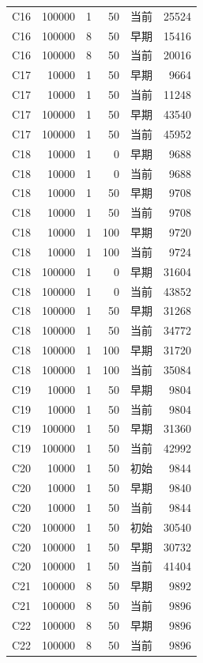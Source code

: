 \documentclass[UTF8,a4paper,10pt,twocolumn,fontset=fandol]{ctexart}
\begin{document}
\begin{longtable}{@{}lrrrlr@{}}
C16 & 100000 & 1 & 50 & 当前 & 25524 \\
C16 & 100000 & 8 & 50 & 早期 & 15416 \\
C16 & 100000 & 8 & 50 & 当前 & 20016 \\
C17 & 10000 & 1 & 50 & 早期 & 9664 \\
C17 & 10000 & 1 & 50 & 当前 & 11248 \\
C17 & 100000 & 1 & 50 & 早期 & 43540 \\
C17 & 100000 & 1 & 50 & 当前 & 45952 \\
C18 & 10000 & 1 & 0 & 早期 & 9688 \\
C18 & 10000 & 1 & 0 & 当前 & 9688 \\
C18 & 10000 & 1 & 50 & 早期 & 9708 \\
C18 & 10000 & 1 & 50 & 当前 & 9708 \\
C18 & 10000 & 1 & 100 & 早期 & 9720 \\
C18 & 10000 & 1 & 100 & 当前 & 9724 \\
C18 & 100000 & 1 & 0 & 早期 & 31604 \\
C18 & 100000 & 1 & 0 & 当前 & 43852 \\
C18 & 100000 & 1 & 50 & 早期 & 31268 \\
C18 & 100000 & 1 & 50 & 当前 & 34772 \\
C18 & 100000 & 1 & 100 & 早期 & 31720 \\
C18 & 100000 & 1 & 100 & 当前 & 35084 \\
C19 & 10000 & 1 & 50 & 早期 & 9804 \\
C19 & 10000 & 1 & 50 & 当前 & 9804 \\
C19 & 100000 & 1 & 50 & 早期 & 31360 \\
C19 & 100000 & 1 & 50 & 当前 & 42992 \\
C20 & 10000 & 1 & 50 & 初始 & 9844 \\
C20 & 10000 & 1 & 50 & 早期 & 9840 \\
C20 & 10000 & 1 & 50 & 当前 & 9844 \\
C20 & 100000 & 1 & 50 & 初始 & 30540 \\
C20 & 100000 & 1 & 50 & 早期 & 30732 \\
C20 & 100000 & 1 & 50 & 当前 & 41404 \\
C21 & 100000 & 8 & 50 & 早期 & 9892 \\
C21 & 100000 & 8 & 50 & 当前 & 9896 \\
C22 & 100000 & 8 & 50 & 早期 & 9896 \\
C22 & 100000 & 8 & 50 & 当前 & 9896 \\
\end{longtable}
\endgroup
\end{document}
